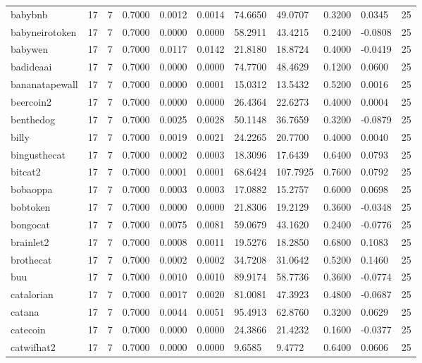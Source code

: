 \begin{table}[htbp]
\begin{tabular}{lllllllllll}
babybnb & 17 & 7 & 0.7000 & 0.0012 & 0.0014 & 74.6650 & 49.0707 & 0.3200 & 0.0345 & 25 \\
babyneirotoken & 17 & 7 & 0.7000 & 0.0000 & 0.0000 & 58.2911 & 43.4215 & 0.2400 & -0.0808 & 25 \\
babywen & 17 & 7 & 0.7000 & 0.0117 & 0.0142 & 21.8180 & 18.8724 & 0.4000 & -0.0419 & 25 \\
badideaai & 17 & 7 & 0.7000 & 0.0000 & 0.0000 & 74.7700 & 48.4629 & 0.1200 & 0.0600 & 25 \\
bananatapewall & 17 & 7 & 0.7000 & 0.0000 & 0.0001 & 15.0312 & 13.5432 & 0.5200 & 0.0016 & 25 \\
beercoin2 & 17 & 7 & 0.7000 & 0.0000 & 0.0000 & 26.4364 & 22.6273 & 0.4000 & 0.0004 & 25 \\
benthedog & 17 & 7 & 0.7000 & 0.0025 & 0.0028 & 50.1148 & 36.7659 & 0.3200 & -0.0879 & 25 \\
billy & 17 & 7 & 0.7000 & 0.0019 & 0.0021 & 24.2265 & 20.7700 & 0.4000 & 0.0040 & 25 \\
bingusthecat & 17 & 7 & 0.7000 & 0.0002 & 0.0003 & 18.3096 & 17.6439 & 0.6400 & 0.0793 & 25 \\
bitcat2 & 17 & 7 & 0.7000 & 0.0001 & 0.0001 & 68.6424 & 107.7925 & 0.7600 & 0.0792 & 25 \\
bobaoppa & 17 & 7 & 0.7000 & 0.0003 & 0.0003 & 17.0882 & 15.2757 & 0.6000 & 0.0698 & 25 \\
bobtoken & 17 & 7 & 0.7000 & 0.0000 & 0.0000 & 21.8306 & 19.2129 & 0.3600 & -0.0348 & 25 \\
bongocat & 17 & 7 & 0.7000 & 0.0075 & 0.0081 & 59.0679 & 43.1620 & 0.2400 & -0.0776 & 25 \\
brainlet2 & 17 & 7 & 0.7000 & 0.0008 & 0.0011 & 19.5276 & 18.2850 & 0.6800 & 0.1083 & 25 \\
brothecat & 17 & 7 & 0.7000 & 0.0002 & 0.0002 & 34.7208 & 31.0642 & 0.5200 & 0.1460 & 25 \\
buu & 17 & 7 & 0.7000 & 0.0010 & 0.0010 & 89.9174 & 58.7736 & 0.3600 & -0.0774 & 25 \\
catalorian & 17 & 7 & 0.7000 & 0.0017 & 0.0020 & 81.0081 & 47.3923 & 0.4800 & -0.0687 & 25 \\
catana & 17 & 7 & 0.7000 & 0.0044 & 0.0051 & 95.4913 & 62.8760 & 0.3200 & 0.0629 & 25 \\
catecoin & 17 & 7 & 0.7000 & 0.0000 & 0.0000 & 24.3866 & 21.4232 & 0.1600 & -0.0377 & 25 \\
catwifhat2 & 17 & 7 & 0.7000 & 0.0000 & 0.0000 & 9.6585 & 9.4772 & 0.6400 & 0.0606 & 25 \\

\end{tabular}
\end{table}
